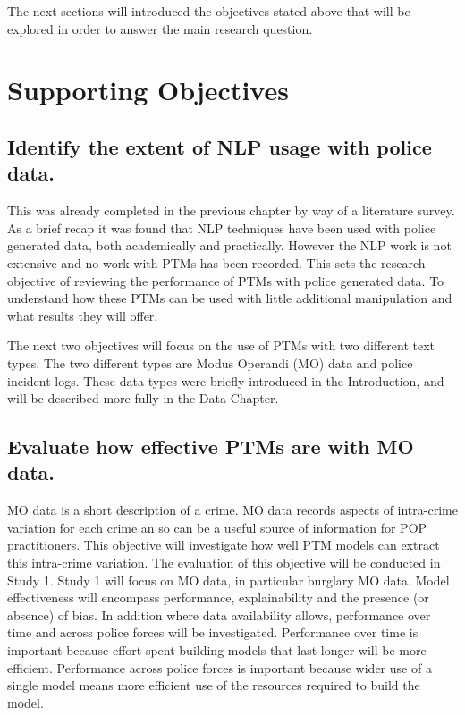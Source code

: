 The next sections will introduced the objectives stated above that will be explored in order to answer the main research question. 



\section{Supporting Objectives} 




\subsection{Identify the extent of NLP usage with police data.}  This was already completed in the previous chapter by way of a literature survey.  As a brief recap it was found that NLP techniques have been used with police generated data, both academically and practically. However the NLP work is not extensive and no work with PTMs has been recorded. This sets the research objective of reviewing the performance of PTMs with police generated data. To understand how these PTMs can be used with little additional manipulation and what results they will offer. 

The next two objectives will focus on the use of PTMs with two different text types. The two different types are Modus Operandi (MO) data and police incident logs. These data types were briefly introduced in the Introduction, and will be described more fully in the Data Chapter. 

\subsection{Evaluate how effective PTMs are with MO data.} MO data is a short description of a crime. MO data records aspects of intra-crime variation for each crime an so can be a useful source of information for POP practitioners. This objective will investigate how well PTM models can extract this intra-crime variation. The evaluation of this objective will be conducted in Study 1. Study 1 will focus on MO data, in particular burglary MO data. Model effectiveness  will encompass  performance, explainability and the presence (or absence) of bias.  In addition where data availability allows, performance over time and across police forces will be investigated. Performance over time is important because effort spent building models that last longer will be more efficient. Performance across police forces is important because wider use of a single model means more efficient use of the resources required to build the model.   

